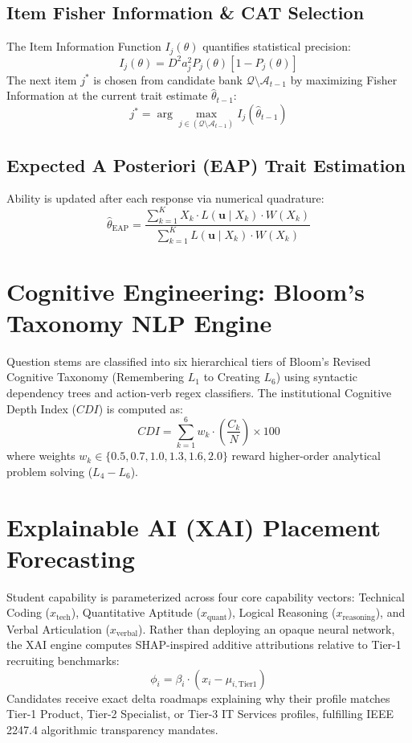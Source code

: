 \documentclass[conference]{IEEEtran}
\begin{document}
\subsection{Item Fisher Information \& CAT Selection}
The Item Information Function $I_j(\theta)$ quantifies statistical precision:
\begin{equation}
I_j(\theta) = D^2 a_j^2 P_j(\theta) [1 - P_j(\theta)]
\end{equation}
The next item $j^*$ is chosen from candidate bank $\mathcal{Q} \setminus \mathcal{A}_{t-1}$ by maximizing Fisher Information at the current trait estimate $\hat{\theta}_{t-1}$:
\begin{equation}
j^* = \arg\max_{j \in (\mathcal{Q} \setminus \mathcal{A}_{t-1})} I_j(\hat{\theta}_{t-1})
\end{equation}

\subsection{Expected A Posteriori (EAP) Trait Estimation}
Ability is updated after each response via numerical quadrature:
\begin{equation}
\hat{\theta}_{\text{EAP}} = \frac{\sum_{k=1}^K X_k \cdot L(\mathbf{u} \mid X_k) \cdot W(X_k)}{\sum_{k=1}^K L(\mathbf{u} \mid X_k) \cdot W(X_k)}
\end{equation}

\section{Cognitive Engineering: Bloom's Taxonomy NLP Engine}
Question stems are classified into six hierarchical tiers of Bloom's Revised Cognitive Taxonomy (Remembering $L_1$ to Creating $L_6$) using syntactic dependency trees and action-verb regex classifiers. The institutional Cognitive Depth Index ($CDI$) is computed as:
\begin{equation}
CDI = \sum_{k=1}^6 w_k \cdot \left(\frac{C_k}{N}\right) \times 100
\end{equation}
where weights $w_k \in \{0.5, 0.7, 1.0, 1.3, 1.6, 2.0\}$ reward higher-order analytical problem solving ($L_4 - L_6$).

\section{Explainable AI (XAI) Placement Forecasting}
Student capability is parameterized across four core capability vectors: Technical Coding ($x_{\text{tech}}$), Quantitative Aptitude ($x_{\text{quant}}$), Logical Reasoning ($x_{\text{reasoning}}$), and Verbal Articulation ($x_{\text{verbal}}$). Rather than deploying an opaque neural network, the XAI engine computes SHAP-inspired additive attributions relative to Tier-1 recruiting benchmarks:
\begin{equation}
\phi_i = \beta_i \cdot (x_i - \mu_{i, \text{Tier1}})
\end{equation}
Candidates receive exact delta roadmaps explaining why their profile matches Tier-1 Product, Tier-2 Specialist, or Tier-3 IT Services profiles, fulfilling IEEE 2247.4 algorithmic transparency mandates.
\end{document}
